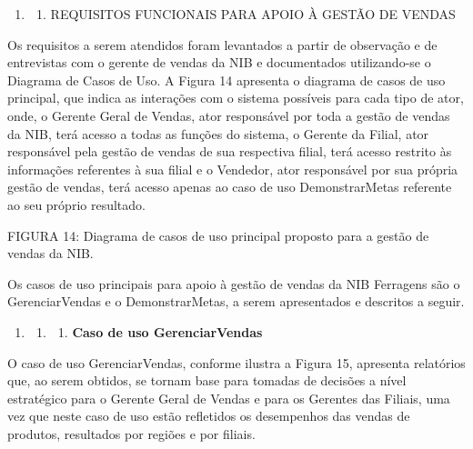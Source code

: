 \documentclass[a4paper]{article}
\newcounter{saveenum}
\newcommand\liststyleWWviiiNumi{%
\renewcommand\theenumi{\arabic{enumi}}
\renewcommand\theenumii{\arabic{enumi}.\arabic{enumii}}
\renewcommand\theenumiii{\arabic{enumi}.\arabic{enumii}.\arabic{enumiii}}
\renewcommand\theenumiv{\arabic{enumi}.\arabic{enumii}.\arabic{enumiii}.\arabic{enumiv}}
\renewcommand\labelenumi{\theenumi}
\renewcommand\labelenumii{\theenumii}
\renewcommand\labelenumiii{\theenumiii}
\renewcommand\labelenumiv{\theenumiv.}
}
\begin{document}
\bigskip

\liststyleWWviiiNumi
\begin{enumerate}
\item \begin{enumerate}
\item {\sffamily
REQUISITOS FUNCIONAIS PARA APOIO \`A GEST\~AO DE VENDAS}
\end{enumerate}
\end{enumerate}
{
\textsf{Os requisitos a serem atendidos foram levantados a partir de observa\c{c}\~ao e de entrevistas com o gerente de
vendas da NIB e documentados utilizando-se o Diagrama de Casos de Uso. A Figura 14 apresenta o diagrama de casos de uso
principal, que indica as intera\c{c}\~oes com o sistema poss\'iveis para cada tipo de ator, onde, o Gerente Geral de
Vendas, ator respons\'avel por toda a gest\~ao de vendas da NIB, ter\'a acesso a todas as fun\c{c}\~oes do sistema, o
Gerente da Filial, ator respons\'avel pela gest\~ao de vendas de sua respectiva filial, ter\'a acesso restrito \`as
informa\c{c}\~oes referentes \`a sua filial e o Vendedor, ator respons\'avel por sua pr\'opria gest\~ao de vendas,
ter\'a acesso apenas ao caso de uso DemonstrarMetas referente ao seu pr\'oprio resultado. }}


\bigskip

{%
 \par}
{
\textsf{\MakeUppercase{FIGURA 14}}\textsf{: Diagrama de casos de uso principal proposto para a gest\~ao de vendas da
NIB. }}

{
\textsf{Os casos de uso principais para apoio \`a gest\~ao de vendas da NIB Ferragens s\~ao o GerenciarVendas e o
DemonstrarMetas, a serem apresentados e descritos a seguir.}}


\bigskip

\liststyleWWviiiNumi
\setcounter{saveenum}{\value{enumi}}
\begin{enumerate}
\setcounter{enumi}{\value{saveenum}}
\item \setcounter{saveenum}{\value{enumii}}
\begin{enumerate}
\setcounter{enumii}{\value{saveenum}}
\item \setcounter{saveenum}{\value{enumiii}}
\begin{enumerate}
\setcounter{enumiii}{\value{saveenum}}
\item {\sffamily\bfseries
Caso de uso GerenciarVendas}
\end{enumerate}
\end{enumerate}
\end{enumerate}
{
\textsf{O caso de uso GerenciarVendas, conforme ilustra a Figura 15, apresenta relat\'orios que, ao serem obtidos, se
tornam base para tomadas de decis\~oes a n\'ivel estrat\'egico para o Gerente Geral de Vendas e para os Gerentes das
Filiais, uma vez que neste caso de uso est\~ao refletidos os desempenhos das vendas de produtos, resultados por
regi\~oes e por filiais.}}
\end{document}
